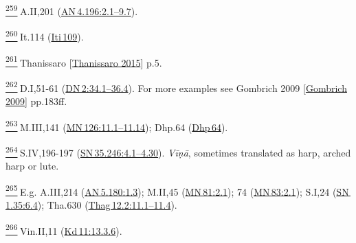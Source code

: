 \label{footprints_split_024.html_fn259}
\hyperref[footprints_split_010.htmlux5cux23fnref259]{\textsuperscript{259}} A.II,201
(\href{https://suttacentral.net/an4.196/en/sujato\#2.1}{AN\,4.196:2.1--9.7}).

\label{footprints_split_024.html_fn260}
\hyperref[footprints_split_010.htmlux5cux23fnref260]{\textsuperscript{260}} It.114
(\href{https://suttacentral.net/iti109/en/sujato}{Iti\,109}).

\label{footprints_split_024.html_fn261}
\hyperref[footprints_split_010.htmlux5cux23fnref261]{\textsuperscript{261}} {Thanissaro
{{[}\hyperref[footprints_split_022.htmlux5cux23Thanissaroux5cux25202015]{Thanissaro
2015}{]}}} p.5.

\label{footprints_split_024.html_fn262}
\hyperref[footprints_split_010.htmlux5cux23fnref262]{\textsuperscript{262}} D.I,51-61
(\href{https://suttacentral.net/dn2/en/sujato\#34.1}{DN\,2:34.1--36.4}).
For more examples see {Gombrich 2009
{{[}\hyperref[footprints_split_022.htmlux5cux23Gombrichux5cux25202009]{Gombrich
2009}{]}}} pp.183ff.

\label{footprints_split_024.html_fn263}
\hyperref[footprints_split_010.htmlux5cux23fnref263]{\textsuperscript{263}} M.III,141
(\href{https://suttacentral.net/mn126/en/sujato\#11.1}{MN\,126:11.1--11.14});
Dhp.64 (\href{https://suttacentral.net/dhp64/en/sujato}{Dhp\,64}).

\label{footprints_split_024.html_fn264}
\hyperref[footprints_split_010.htmlux5cux23fnref264]{\textsuperscript{264}} S.IV,196-197
(\href{https://suttacentral.net/sn35.246/en/sujato\#4.1}{SN\,35.246:4.1--4.30}).
\emph{Vīṇā}, sometimes translated as harp, arched harp or lute.

\label{footprints_split_024.html_fn265}
\hyperref[footprints_split_010.htmlux5cux23fnref265]{\textsuperscript{265}} E.g.
A.III,214
(\href{https://suttacentral.net/an5.180/en/sujato\#1.3}{AN\,5.180:1.3});
M.II,45
(\href{https://suttacentral.net/mn81/en/sujato\#2.1}{MN\,81:2.1}); 74
(\href{https://suttacentral.net/mn83/en/sujato\#2.1}{MN\,83:2.1});
S.I,24
(\href{https://suttacentral.net/sn1.35/en/sujato\#6.4}{SN\,1.35:6.4});
Tha.630
(\href{https://suttacentral.net/thag12.2/en/sujato\#11.1}{Thag\,12.2:11.1--11.4}).

\label{footprints_split_024.html_fn266}
\hyperref[footprints_split_010.htmlux5cux23fnref266]{\textsuperscript{266}} Vin.II,11
(\href{https://suttacentral.net/pli-tv-kd11/en/brahmali?\#13.3.6}{Kd\,11:13.3.6}).

